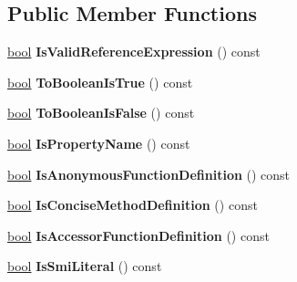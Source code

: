 \subsection*{Public Member Functions}
\begin{DoxyCompactItemize}
\item 
\mbox{\label{classv8_1_1internal_1_1Expression_a336135a84ba54434ed5b8614d82b2b0c}} 
\mbox{\hyperlink{classbool}{bool}} {\bfseries Is\+Valid\+Reference\+Expression} () const
\item 
\mbox{\label{classv8_1_1internal_1_1Expression_ad0f77ba6549f0fb58909bf195aa0bbf9}} 
\mbox{\hyperlink{classbool}{bool}} {\bfseries To\+Boolean\+Is\+True} () const
\item 
\mbox{\label{classv8_1_1internal_1_1Expression_a0538bdc8dfd2b9e09a1041756e8ca5c0}} 
\mbox{\hyperlink{classbool}{bool}} {\bfseries To\+Boolean\+Is\+False} () const
\item 
\mbox{\label{classv8_1_1internal_1_1Expression_afe17f912a40333f92b3200f53f7af0db}} 
\mbox{\hyperlink{classbool}{bool}} {\bfseries Is\+Property\+Name} () const
\item 
\mbox{\label{classv8_1_1internal_1_1Expression_a4e4a2946cd7b8535af42f042944f92f6}} 
\mbox{\hyperlink{classbool}{bool}} {\bfseries Is\+Anonymous\+Function\+Definition} () const
\item 
\mbox{\label{classv8_1_1internal_1_1Expression_afd3bcd22669a345b0fab87e1d3cdeca2}} 
\mbox{\hyperlink{classbool}{bool}} {\bfseries Is\+Concise\+Method\+Definition} () const
\item 
\mbox{\label{classv8_1_1internal_1_1Expression_a18f619cb504201f2e5e365a86220d1d1}} 
\mbox{\hyperlink{classbool}{bool}} {\bfseries Is\+Accessor\+Function\+Definition} () const
\item 
\mbox{\label{classv8_1_1internal_1_1Expression_af0f66a9830266f28d3b7caccf230cb54}} 
\mbox{\hyperlink{classbool}{bool}} {\bfseries Is\+Smi\+Literal} () const

\end{DoxyCompactItemize}
